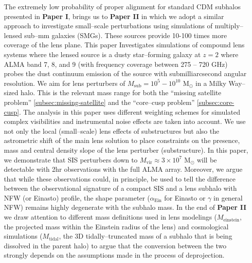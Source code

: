 \documentclass[a4wide,12pt]{book}
\begin{document}
The extremely low probability of proper alignment for standard CDM subhalos presented in {\bf Paper I}, brings us to {\bf Paper II} in which we adopt a similar approach to investigate small--scale perturbations using simulations of multiply--lensed sub--mm galaxies (SMGs).  These sources provide 10-100 times more coverage of the lens plane. This paper Investigates simulations of compound lens systems where the lensed source is a dusty star--forming galaxy at $z = 2$ where ALMA band 7, 8, and 9 (with frequency coverage between 275 -- 720 GHz) probes the dust continuum emission of the source with submilliarcsecond angular resolution.  We aim for lens perturbers of $M_\mathrm{sub} = 10^5 - 10^{10} $ $\mathrm{M}_{\odot} $  in a Milky Way--sized halo.  This is the relevant mass range for both the ``missing satellite problem'' \ref{subsec:missing-satellite} and the ``core--cusp problem'' \ref{subsec:core-cusp}. The analysis in this paper uses different weighting schemes for simulated complex visibilities and instrumental noise effects are taken into account. We use not only the local (small--scale) lens effects of substructures but also the astrometric shift of the main lens solution to place constraints on the presence, mass and central density slope of the lens perturber (substructure). In this paper, we demonstrate that SIS perturbers down to $M_\mathrm{vir} \approx 3\times 10^7 $ $\mathrm{M}_{\odot} $  will be detectable with 2hr observations with the full ALMA array. Moreover, we argue that while these observations could, in principle, be used to tell the difference between the observational signature of a compact SIS and a lens subhalo with NFW (or Einasto) profile, the shape parameter ($\alpha_\mathrm{Ein}$ for Einasto or $\gamma$ in general NFW) remains highly degenerate with the subhalo mass. In the end of {\bf Paper II} we draw attention to different mass definitions used in lens modelings ($M_\mathrm{einstein}$, the projected mass within the Einstein radius of the lens) and cosmological simulations ($M_\mathrm{tidal}$, the 3D tidally--truncated mass of a subhalo that is being dissolved in the parent halo) to argue that the conversion between the two strongly depends on the assumptions made in the process of deprojection. 



 
\end{document}
